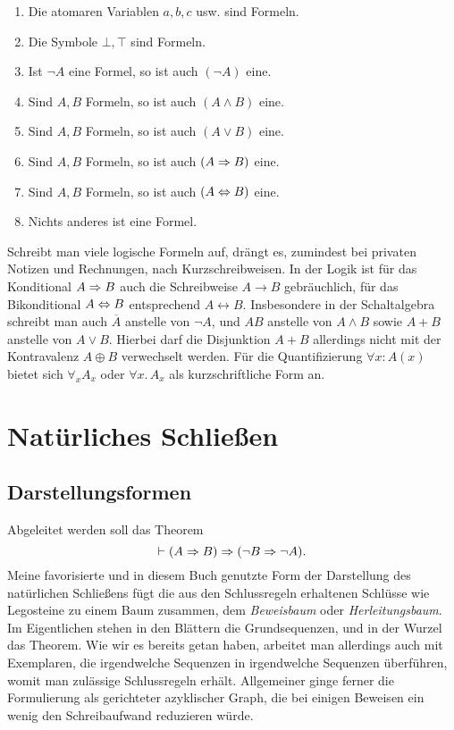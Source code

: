 \begin{enumerate}\setlength\itemsep{0em}
\item Die atomaren Variablen $a,b,c$ usw. sind Formeln.
\item Die Symbole $\bot,\top$ sind Formeln.
\item Ist $\lnot A$ eine Formel, so ist auch $(\lnot A)$ eine.
\item Sind $A,B$ Formeln, so ist auch $(A\land B)$ eine.
\item Sind $A,B$ Formeln, so ist auch $(A\lor B)$ eine.
\item Sind $A,B$ Formeln, so ist auch $(A\Rightarrow B)$ eine.
\item Sind $A,B$ Formeln, so ist auch $(A\Leftrightarrow B)$ eine.
\item Nichts anderes ist eine Formel.
\end{enumerate}

\noindent
Schreibt man viele logische Formeln auf, drängt es, zumindest bei privaten
Notizen und Rechnungen, nach Kurzschreibweisen. In der Logik ist für das
Konditional $A\Rightarrow B$ auch die Schreibweise $A\rightarrow B$ gebräuchlich,
für das Bikonditional $A\Leftrightarrow B$ entsprechend $A\leftrightarrow B$.
Insbesondere in der Schaltalgebra schreibt man auch $\overline A$
anstelle von $\lnot A$, und $AB$ anstelle von $A\land B$ sowie $A+B$
anstelle von $A\lor B$. Hierbei darf die Disjunktion $A+B$ allerdings
nicht mit der Kontravalenz $A\oplus B$ verwechselt werden. Für die
Quantifizierung $\forall x\colon A(x)$ bietet sich $\forall_x A_x$ oder
$\forall x.\, A_x$ als kurzschriftliche Form an.

\newpage
\section{Natürliches Schließen}

\subsection{Darstellungsformen}

Abgeleitet werden soll das Theorem
\[\vdash (A\Rightarrow B)\Rightarrow (\lnot B\Rightarrow\lnot A).\]
Meine favorisierte und in diesem Buch genutzte Form der Darstellung
des natürlichen Schließens fügt die aus den Schlussregeln erhaltenen
Schlüsse wie Legosteine zu einem Baum zusammen, dem
\emph{Beweisbaum} oder \emph{Herleitungsbaum}.
Im Eigentlichen stehen in den Blättern die Grundsequenzen, und in der
Wurzel das Theorem. Wie wir es bereits getan haben, arbeitet man
allerdings auch mit Exemplaren, die irgendwelche Sequenzen in
irgendwelche Sequenzen überführen, womit man zulässige Schlussregeln
erhält. Allgemeiner ginge ferner die Formulierung als gerichteter
azyklischer Graph, die bei einigen Beweisen ein wenig den
Schreibaufwand reduzieren würde.


